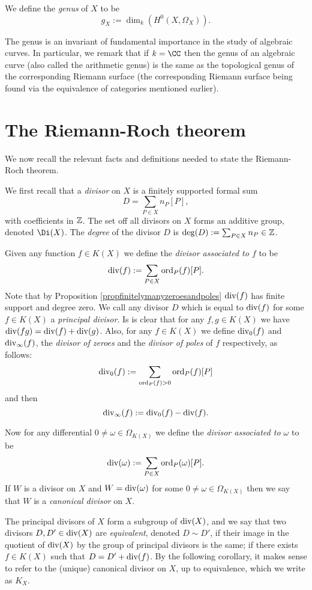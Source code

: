     \begin{defn}\label{definitiongenus}
    We define the \emph{genus} of $X$ to be
        \[
        g_X := \dim_k \left( H^0(X,\Omega_X)\right).
        \]
    \end{defn}

The genus is an invariant of fundamental importance in the study of algebraic curves.
In particular, we remark that if $k = \CC$ then the genus of an algebraic curve (also called the arithmetic genus) is the same as the topological genus of the corresponding Riemann surface (the corresponding Riemann surface being found via the equivalence of categories mentioned earlier).

\section{The Riemann-Roch theorem}

We now recall the relevant facts and definitions needed to state the Riemann-Roch theorem.

We first recall that a \emph{divisor} on $X$ is a finitely supported formal sum 
    \[
    D = \sum_{P \in X} n_P[P],
    \]
with coefficients in ${\mathbb Z}$.
The set off all divisors on $X$ forms an additive group, denoted $\Di (X)$.
The \emph{degree} of the divisor $D$ is $\deg(D) := \sum_{P \in X} n_P \in {\mathbb Z}$.


Given any function $f \in K(X)$ we define the \emph{divisor associated to $f$} to be
    \[
    \operatorname{div}(f) := \sum_{P \in X} \operatorname{ord}_P(f) [P].
    \]
Note that by Proposition \ref{propfinitelymanyzeroesandpoles} $\operatorname{div}(f)$ has finite support and degree zero.
We call any divisor $D$ which is equal to $\operatorname{div}(f)$ for some $f \in K(X)$ a \emph{principal divisor}.
Is is clear that for any $f, g \in K(X)$ we have $\operatorname{div}(fg) = \operatorname{div}(f) + \operatorname{div}(g)$.
Also, for any $f \in K(X)$ we define $\operatorname{div}_0(f)$ and $\operatorname{div}_\infty (f)$, the \emph{divisor of zeroes} and the \emph{divisor of poles} of $f$ respectively, as follows:
    \[
    \operatorname{div}_0(f) := \sum_{\operatorname{ord}_P(f) >0} \operatorname{ord}_P(f)[P]
    \]
and then
    \[
    \operatorname{div}_\infty(f) := \operatorname{div}_0(f) - \operatorname{div}(f).
    \]

Now for any differential $0 \neq \omega \in \Omega_{K(X)}$ we define the \emph{divisor associated to $\omega$} to be
    \[
    \operatorname{div}(\omega) := \sum_{P \in X} \operatorname{ord}_P(\omega)[P].
    \]
If $W$ is a divisor on $X$ and $W = \operatorname{div}(\omega)$ for some $ 0 \neq \omega \in \Omega_{K(X)}$ then we say that $W$ is a \emph{canonical divisor} on $X$.

The principal divisors of $X$ form a subgroup of $\operatorname{div}(X)$, and we say that two divisors $D, D' \in \operatorname{div}(X)$ are \emph{equivalent}, denoted $D \sim D'$, if their image in the quotient of $\operatorname{div}(X)$ by the group of principal divisors is the same; \ie if there exists $f \in K(X)$ such that $ D = D' + \operatorname{div}(f)$.
By the following corollary, it makes sense to refer to the (unique) canonical divisor on $X$, up to equivalence, which we write as $K_X$.

